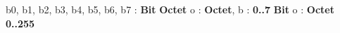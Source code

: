 \begin{algorithme}
    {b0, b1, b2, b3, b4, b5, b6, b7 : \textbf{Bit}}
    {\textbf{Octet}}
    {}
    {o : \textbf{Octet}, b : \textbf{0..7}}
    {\textbf{Bit}}
    {}
    {o : \textbf{Octet}}
    {\textbf{0..255}}
    {}
\end{algorithme}
